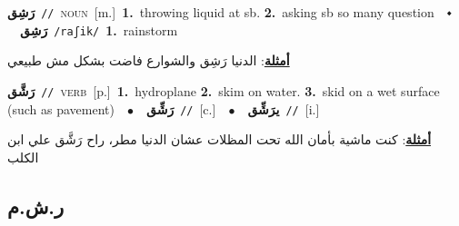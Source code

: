 \documentclass[10pt,a4paper,twoside]{article} %
\begin{document}
\begin{multicols}{2}
{\setlength\topsep{0pt}\textbf{\foreignlanguage{arabic}{رَشِق}}\ {\color{gray}\texttt{//}\color{black}}\ \textsc{noun}\ [m.]\ \textbf{1.}~throwing liquid at sb.  \textbf{2.}~asking sb so many question\ \ $\smblkdiamond$\ \ \setlength\topsep{0pt}\textbf{\foreignlanguage{arabic}{رَشِق}}\ {\color{gray}\texttt{/raʃik/}\color{black}}\ \textbf{1.}~rainstorm\  \begin{flushright}\color{gray}\foreignlanguage{arabic}{\textbf{\underline{\foreignlanguage{arabic}{أمثلة}}}: الدنيا رَشِق والشوارع فاضت بشكل مش طبيعي}\end{flushright}\color{black}} \vspace{2mm}

{\setlength\topsep{0pt}\textbf{\foreignlanguage{arabic}{رَشَّق}}\ {\color{gray}\texttt{//}\color{black}}\ \textsc{verb}\ [p.]\ \textbf{1.}~hydroplane  \textbf{2.}~skim on water.  \textbf{3.}~skid on a wet surface (such as pavement)\ \ $\bullet$\ \ \setlength\topsep{0pt}\textbf{\foreignlanguage{arabic}{رَشِّق}}\ {\color{gray}\texttt{//}\color{black}}\ [c.]\ \ $\bullet$\ \ \setlength\topsep{0pt}\textbf{\foreignlanguage{arabic}{يرَشِّق}}\ {\color{gray}\texttt{//}\color{black}}\ [i.]\  \begin{flushright}\color{gray}\foreignlanguage{arabic}{\textbf{\underline{\foreignlanguage{arabic}{أمثلة}}}: كنت ماشية بأمان الله تحت المظلات عشان الدنيا مطر، راح رَشَّق علي ابن الكلب}\end{flushright}\color{black}} \vspace{2mm}

\vspace{-3mm}
\subsection*{\color{blue}\foreignlanguage{arabic}{ر.ش.م}\color{blue}{}} 


\end{multicols}
\end{document}
